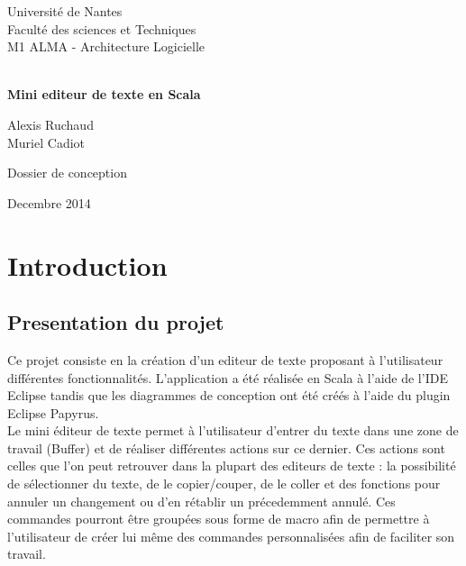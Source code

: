\documentclass[11pt,a4paper,oldfontcommands]{memoir}
\begin{document}
%
%
\thispagestyle{empty}

{%
\sffamily
\centering
\Large
Université de Nantes\\
Faculté des sciences et Techniques\\
M1 ALMA - Architecture Logicielle\\



~\vspace{\fill}

{\huge 
\textbf{Mini editeur de texte en Scala}
}

\vspace{4cm}

{\LARGE
Alexis Ruchaud\\
Muriel Cadiot
}\\


\vspace{3.5cm}

Dossier de conception\\[1em]


\vspace{3.5cm}



\vspace{\fill}

Decembre 2014

}%

\clearpage
\tableofcontents*


\clearpage
\chapter{Introduction}
\section{Presentation du projet}

Ce projet consiste en la création d'un editeur de texte proposant à l'utilisateur différentes fonctionnalités. L'application a été réalisée en Scala à l'aide de l'IDE Eclipse tandis que les diagrammes de conception ont été créés à l'aide du plugin Eclipse Papyrus.\\
Le mini éditeur de texte permet à l'utilisateur d'entrer du texte dans une zone de travail (Buffer) et de réaliser différentes actions sur ce dernier. Ces actions sont celles que l'on peut retrouver dans la plupart des editeurs de texte : la possibilité de sélectionner du texte, de le copier/couper, de le coller et des fonctions pour annuler un changement ou d'en rétablir un précedemment annulé. Ces commandes pourront être groupées sous forme de macro afin de permettre à l'utilisateur de créer lui même des commandes personnalisées afin de faciliter son travail.
\end{document}
